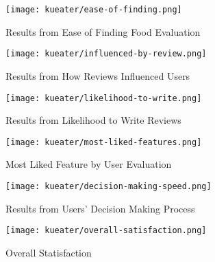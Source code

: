 \begin{figure}[h!]
    \centering
    \texttt{[image: kueater/ease-of-finding.png]}
    \caption{Results from Ease of Finding Food Evaluation}
    \label{fig:ease-of-finding}
\end{figure}

\begin{figure}[h!]
    \centering
    \texttt{[image: kueater/influenced-by-review.png]}
    \caption{Results from How Reviews Influenced Users}
    \label{fig:influenced-by-review}
\end{figure}

\begin{figure}[h!]
    \centering
    \texttt{[image: kueater/likelihood-to-write.png]}
    \caption{Results from Likelihood to Write Reviews}
    \label{fig:likelihood-to-write}
\end{figure}

\begin{figure}[h!]
    \centering
    \texttt{[image: kueater/most-liked-features.png]}
    \caption{Most Liked Feature by User Evaluation}
    \label{fig:most-liked-features}
\end{figure}

\begin{figure}[h!]
    \centering
    \texttt{[image: kueater/decision-making-speed.png]}
    \caption{Results from Users' Decision Making Process}
    \label{fig:decision-making-speed}
\end{figure}

\begin{figure}[h!]
    \centering
    \texttt{[image: kueater/overall-satisfaction.png]}
    \caption{Overall Statisfaction}
    \label{fig:overall-satisfaction}
\end{figure}